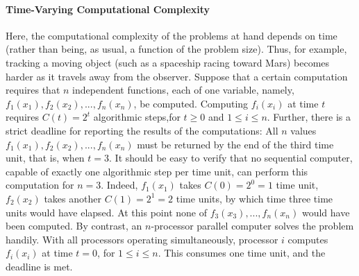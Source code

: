 \documentclass[12pt,a4paper]{report}
\begin{document}
\paragraph{Time-Varying Computational Complexity}
Here, the computational complexity of the problems at hand depends on time (rather than being, as usual, a function of the problem size). Thus, for example, tracking a moving object (such as a spaceship racing toward Mars) becomes harder as it travels away from the observer.
Suppose that a certain computation requires that $n$ independent functions, each of one variable, namely, $f_1(x_1), f_2(x_2), ..., f_n(x_n)$, be computed. Computing $f_i(x_i)$ at time $t$ requires $C(t) = 2^t$ algorithmic steps,for $t\geq 0$ and $1 \leq i \leq n$. Further, there is a strict deadline for reporting the results of the computations: All $n$ values $f_1(x_1), f_2(x_2), ..., f_n(x_n)$ must be returned by the end of the third time unit, that is, when $t = 3$.
It should be easy to verify that no sequential computer, capable of exactly one algorithmic step per time unit, can perform this computation for $n = 3$. Indeed, $f_1(x_1)$ takes $C(0) = 2^0 = 1$ time unit, $f_2(x_2)$ takes another $C(1) = 2^1 = 2$ time units, by which time three time units would have elapsed. At this point none of $f_3(x_3), ..., f_n(x_n)$ would have been computed. By contrast, an $n$-processor parallel computer solves the problem handily. With all processors operating simultaneously, processor $i$ computes $f_i(x_i)$ at time $t = 0$, for $1 \leq i \leq n$. This consumes one time unit, and the deadline is met.
\end{document}
